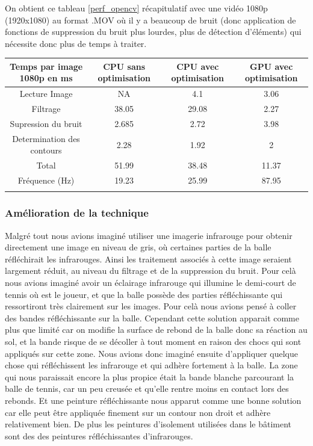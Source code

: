 On obtient ce tableau \ref{perf_opencv} récapitulatif avec une vidéo 1080p (1920x1080) au format .MOV où il y a beaucoup de bruit (donc application de fonctions de suppression du bruit plus lourdes, plus de détection d'éléments) qui nécessite donc plus de temps à traiter.

\begin{tabular}{|c|c|c|c|}
\hline
Temps par image 1080p en ms & CPU sans optimisation & CPU avec optimisation & GPU avec optimisation \\
\hline
Lecture Image & NA & 4.1 & 3.06 \\
\hline
Filtrage & 38.05 & 29.08 & 2.27\\
\hline
Supression du bruit & 2.685 & 2.72 & 3.98\\
\hline
Determination des contours & 2.28 & 1.92 & 2\\
\hline
Total & 51.99 & 38.48 & 11.37\\
\hline
Fréquence (Hz) & 19.23 & 25.99 & 87.95\\
\hline
\caption{Temps de calcul par image 1920x1080}
\label{perf_opencv}
\end{tabular}


\subsubsection{Amélioration de la technique}

Malgré tout nous avions imaginé utiliser une imagerie infrarouge pour obtenir directement une image en niveau de gris, où certaines parties de la balle réfléchirait les infrarouges. Ainsi les traitement associés à cette image seraient largement réduit, au niveau du filtrage et de la suppression du bruit. Pour celà nous avions imaginé avoir un éclairage infrarouge qui illumine le demi-court de tennis où est le joueur, et que la balle possède des parties réfléchissante qui ressortiront très clairement sur les images. Pour celà nous avions pensé à coller des bandes réfléchissante sur la balle. Cependant cette solution apparait comme plus que limité car on modifie la surface de rebond de la balle donc sa réaction au sol, et la bande risque de se décoller à tout moment en raison des chocs qui sont appliqués sur cette zone. Nous avions donc imaginé ensuite d'appliquer quelque chose qui réfléchissent les infrarouge et qui adhère fortement à la balle. La zone qui nous paraissait encore la plus propice était la bande blanche parcourant la balle de tennis, car un peu creusée et qu'elle rentre moins en contact lors des rebonds. Et une peinture réfléchissante nous apparut comme une bonne solution car elle peut être appliquée finement sur un contour non droit et adhère relativement bien. De plus les peintures d'isolement utilisées dans le bâtiment sont des des peintures réfléchissantes d'infrarouges.\\


